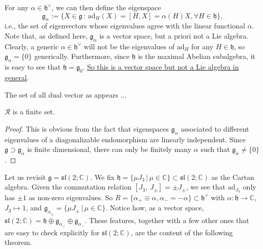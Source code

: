 For any \(\alpha \in \mathfrak{h}^\vee\), we can then define the eigenspace
\[
    \mathfrak{g}_{\alpha} := \{ X \in \mathfrak{g} \,:\, \mathrm{ad}_H(X) = [H, X] = \alpha(H) X, \forall H \in \mathfrak{h} \},
\]
i.e., the set of eigenvectors whose eigenvalues agree with the linear functional \(\alpha\). Note that, as defined here, \(\mathfrak{g}_{\alpha}\) is a vector space, but a priori not a Lie algebra. Clearly, a generic \(\alpha \in \mathfrak{h}^\vee\) will not be the eigenvalues of \(\mathrm{ad}_H\) for any \(H \in \mathfrak{h}\), so \(\mathfrak{g}_{\alpha} = \{0\}\) generically. Furthermore, since \(\mathfrak{h}\) is the maximal Abelian subalgebra, it is easy to see that \(\mathfrak{h} = \mathfrak{g}_0\). \uline{So this is a vector space but not a Lie algebra in general}.

\begin{definition}
\end{definition}

The set of all dual vector as appears ...

\begin{lemma}
    \(\mathcal{R}\) is a finite set.
\end{lemma}
\begin{proof}
    This is obvious from the fact that eigenspaces \(\mathfrak{g}_{\alpha}\) associated to different eigenvalues of a diagonalizable endomorphism are linearly independent. Since \(\mathfrak{g}\supset \mathfrak{g}_{\alpha}\) is finite dimensional, there can only be finitely many \(\alpha\) such that \(\mathfrak{g}_\alpha \neq \{0\}\).
\end{proof}

Let us revisit \(\mathfrak{g}=\mathfrak{sl}(2; \mathbb{C})\). We fix \(\mathfrak{h} = \{ \mu J_3 \,|\, \mu \in \mathbb{C} \} \subset \mathfrak{sl}(2; \mathbb{C})\) as the Cartan algebra. Given the commutation relation \([J_3,\,J_{\pm}] = \pm J_{\pm}\), we see that \(\mathrm{ad}_{J_3}\) only has \(\pm 1\) as non-zero eigenvalues. So \(R = \{ \alpha_+ \equiv \alpha, \alpha_- = -\alpha \} \subset \mathfrak{h}^\vee\) with \(\alpha : \mathfrak{h} \to \mathbb{C}\), \(J_3 \mapsto 1\), and \(\mathfrak{g}_{\alpha_\pm} = \{ \mu J_\pm \,|\, \mu \in \mathbb{C} \}\). Notice how, as a vector space, \(\mathfrak{sl}(2; \mathbb{C}) = \mathfrak{h} \oplus \mathfrak{g}_{\alpha_+} \oplus \mathfrak{g}_{\alpha_-} \). These features, together with a few other ones that are easy to check explicitly for \(\mathfrak{sl}(2; \mathbb{C})\), are the content of the following theorem.


